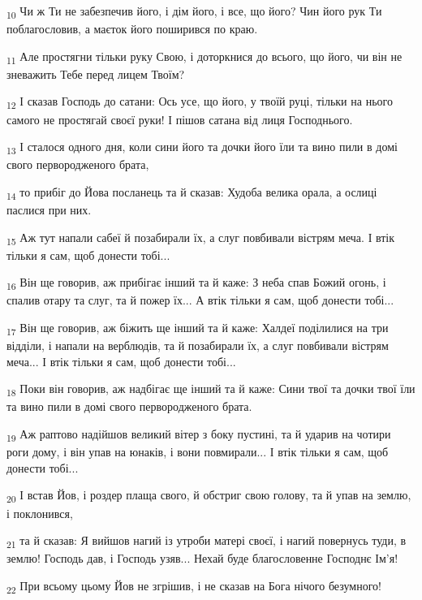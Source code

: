 \begin{tcolorbox}
\textsubscript{10} Чи ж Ти не забезпечив його, і дім його, і все, що його? Чин його рук Ти поблагословив, а маєток його поширився по краю.
\end{tcolorbox}
\begin{tcolorbox}
\textsubscript{11} Але простягни тільки руку Свою, і доторкнися до всього, що його, чи він не зневажить Тебе перед лицем Твоїм?
\end{tcolorbox}
\begin{tcolorbox}
\textsubscript{12} І сказав Господь до сатани: Ось усе, що його, у твоїй руці, тільки на нього самого не простягай своєї руки! І пішов сатана від лиця Господнього.
\end{tcolorbox}
\begin{tcolorbox}
\textsubscript{13} І сталося одного дня, коли сини його та дочки його їли та вино пили в домі свого первородженого брата,
\end{tcolorbox}
\begin{tcolorbox}
\textsubscript{14} то прибіг до Йова посланець та й сказав: Худоба велика орала, а ослиці паслися при них.
\end{tcolorbox}
\begin{tcolorbox}
\textsubscript{15} Аж тут напали сабеї й позабирали їх, а слуг повбивали вістрям меча. І втік тільки я сам, щоб донести тобі...
\end{tcolorbox}
\begin{tcolorbox}
\textsubscript{16} Він ще говорив, аж прибігає інший та й каже: З неба спав Божий огонь, і спалив отару та слуг, та й пожер їх... А втік тільки я сам, щоб донести тобі...
\end{tcolorbox}
\begin{tcolorbox}
\textsubscript{17} Він ще говорив, аж біжить ще інший та й каже: Халдеї поділилися на три відділи, і напали на верблюдів, та й позабирали їх, а слуг повбивали вістрям меча... І втік тільки я сам, щоб донести тобі...
\end{tcolorbox}
\begin{tcolorbox}
\textsubscript{18} Поки він говорив, аж надбігає ще інший та й каже: Сини твої та дочки твої їли та вино пили в домі свого первородженого брата.
\end{tcolorbox}
\begin{tcolorbox}
\textsubscript{19} Аж раптово надійшов великий вітер з боку пустині, та й ударив на чотири роги дому, і він упав на юнаків, і вони повмирали... І втік тільки я сам, щоб донести тобі...
\end{tcolorbox}
\begin{tcolorbox}
\textsubscript{20} І встав Йов, і роздер плаща свого, й обстриг свою голову, та й упав на землю, і поклонився,
\end{tcolorbox}
\begin{tcolorbox}
\textsubscript{21} та й сказав: Я вийшов нагий із утроби матері своєї, і нагий повернусь туди, в землю! Господь дав, і Господь узяв... Нехай буде благословенне Господнє Ім'я!
\end{tcolorbox}
\begin{tcolorbox}
\textsubscript{22} При всьому цьому Йов не згрішив, і не сказав на Бога нічого безумного!
\end{tcolorbox}

